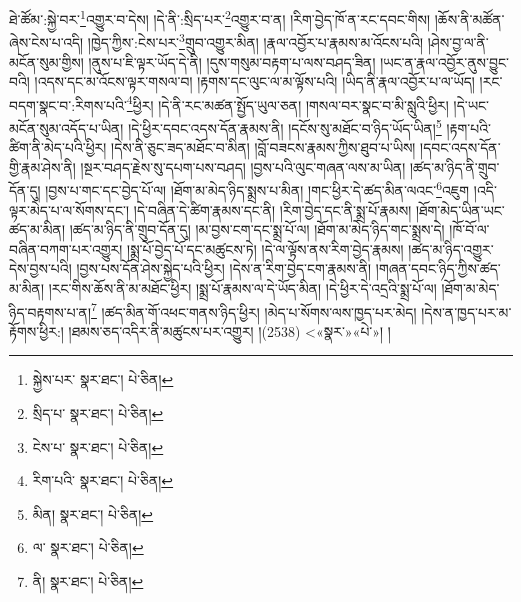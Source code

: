 ཐེ་ཚོམ་:སྐྱེ་བར་\footnote{སྐྱེས་པར་  སྣར་ཐང་།  པེ་ཅིན། }འགྱུར་བ་དེས། །དེ་ནི་:སྲིད་པར་\footnote{སྲིད་པ་  སྣར་ཐང་།  པེ་ཅིན། }འགྱུར་བ་ན། །རིག་བྱེད་ཁོ་ན་རང་དབང་གིས། །ཆོས་ནི་མཚོན་ཞེས་ངེས་པ་འདི། །ཁྱེད་ཀྱིས་:ངེས་པར་\footnote{ངེས་པ་  སྣར་ཐང་།  པེ་ཅིན། }གྲུབ་འགྱུར་མིན། །རྣལ་འབྱོར་པ་རྣམས་མ་འོངས་པའི། །ཤེས་བྱ་ལ་ནི་མངོན་སུམ་གྱིས། །ནུས་པ་ཇི་ལྟར་ཡོད་དེ་ནི། །དུས་གསུམ་བརྟག་པ་ལས་བཤད་ཟིན། །ཡང་ན་རྣལ་འབྱོར་ནུས་བྱུང་བའི། །འདས་དང་མ་འོངས་ལྟར་གསལ་བ། །རྟགས་དང་ལུང་ལ་མ་ལྟོས་པའི། །ཡིད་ནི་རྣལ་འབྱོར་པ་ལ་ཡོད། །རང་བདག་སྣང་བ་:རིགས་པའི་\footnote{རིག་པའི་  སྣར་ཐང་།  པེ་ཅིན། }ཕྱིར། །དེ་ནི་རང་མཚན་སྤྱོད་ཡུལ་ཅན། །གསལ་བར་སྣང་བ་མི་སླུའི་ཕྱིར། །དེ་ཡང་མངོན་སུམ་འདོད་པ་ཡིན། །དེ་ཕྱིར་དབང་འདས་དོན་རྣམས་ནི། །དངོས་སུ་མཐོང་བ་ཉིད་ཡོད་ཡིན།\footnote{མིན།  སྣར་ཐང་།  པེ་ཅིན། } །རྟག་པའི་ཚིག་ནི་མེད་པའི་ཕྱིར། །དེས་ནི་ཅུང་ཟད་མཐོང་བ་མིན། །བློ་བཟངས་རྣམས་ཀྱིས་ཐུབ་པ་ཡིས། །དབང་འདས་དོན་གྱི་རྣམ་ཤེས་ནི། །སྔར་བཤད་རྗེས་སུ་དཔག་པས་བཤད། །བྱས་པའི་ལུང་གཞན་ལས་མ་ཡིན། །ཚད་མ་ཉིད་ནི་གྲུབ་དོན་དུ། །བྱས་པ་གང་དང་བྱེད་པོ་ལ། །ཐོག་མ་མེད་ཉིད་སྨྲས་པ་མིན། །གང་ཕྱིར་དེ་ཚད་མིན་ལའང་\footnote{ལ་  སྣར་ཐང་།  པེ་ཅིན། }འཇུག །འདི་ལྟར་མེད་པ་ལ་སོགས་དང་། །དེ་བཞིན་དེ་ཚིག་རྣམས་དང་ནི། །རིག་བྱེད་དང་ནི་སྨྲ་པོ་རྣམས། །ཐོག་མེད་ཡིན་ཡང་ཚད་མ་མིན། །ཚད་མ་ཉིད་ནི་གྲུབ་དོན་དུ། །མ་བྱས་ངག་དང་སྨྲ་པོ་ལ། །ཐོག་མ་མེད་ཉིད་གང་སྨྲས་དེ། །ཁོ་བོ་ལ་བཞིན་བཀག་པར་འགྱུར། །སྨྲ་པོ་བྱེད་པོ་དང་མཚུངས་ཏེ། །དེ་ལ་ལྟོས་ནས་རིག་བྱེད་རྣམས། །ཚད་མ་ཉིད་འགྱུར་དེས་བྱས་པའི། །བྱས་པས་དོན་ཤེས་སྐྱེད་པའི་ཕྱིར། །དེས་ན་རིག་བྱེད་ངག་རྣམས་ནི། །གཞན་དབང་ཉིད་ཀྱིས་ཚད་མ་མིན། །རང་གིས་ཆོས་ནི་མ་མཐོང་ཕྱིར། །སྨྲ་པོ་རྣམས་ལ་དེ་ཡོད་མིན། །དེ་ཕྱིར་དེ་འདྲའི་སྨྲ་པོ་ལ། །ཐོག་མ་མེད་ཉིད་བརྟགས་པ་ན།\footnote{ནི།  སྣར་ཐང་།  པེ་ཅིན། } །ཚད་མིན་གོ་འཕང་གནས་ཉིད་ཕྱིར། །མེད་པ་སོགས་ལས་ཁྱད་པར་མེད། །དེས་ན་ཁྱད་པར་མ་རྟོགས་ཕྱིར:། །ཐམས་ཅད་འདིར་ནི་མཚུངས་པར་འགྱུར། །(2538) <«སྣར་»«པེ་»། །
